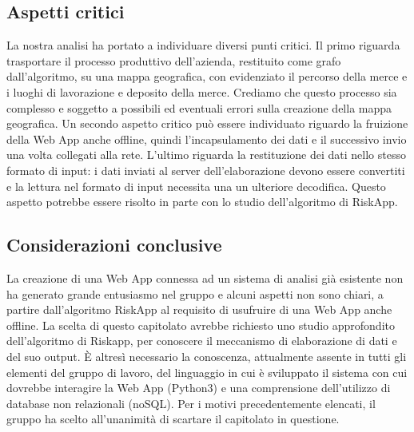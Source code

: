 \subsection{Aspetti critici}

La nostra analisi ha portato a individuare diversi punti critici. Il primo riguarda trasportare il processo produttivo dell’azienda, restituito come grafo dall’algoritmo, su una mappa geografica, con evidenziato il percorso della merce e i luoghi di lavorazione e deposito della merce. Crediamo che questo processo sia complesso e soggetto a possibili ed eventuali errori sulla creazione della mappa geografica.
Un secondo aspetto critico può essere individuato riguardo la fruizione della Web App anche offline, quindi l'incapsulamento dei dati e il successivo invio una volta collegati alla rete. 
L'ultimo riguarda la restituzione dei dati nello stesso formato di input: i dati inviati al server dell'elaborazione devono essere convertiti e la lettura nel formato di input necessita una un ulteriore decodifica. Questo aspetto potrebbe essere risolto in parte con lo studio dell’algoritmo di RiskApp.

\subsection{Considerazioni conclusive}

La creazione di una Web App connessa ad un sistema di analisi già esistente non ha generato grande entusiasmo nel gruppo e alcuni aspetti non sono chiari, a partire dall’algoritmo RiskApp al requisito di usufruire di una Web App anche offline. La scelta di questo capitolato avrebbe richiesto uno studio approfondito dell’algoritmo di Riskapp, per conoscere il meccanismo di elaborazione di dati e del suo output.
È altresì necessario la conoscenza, attualmente assente in tutti gli elementi del gruppo di lavoro, del linguaggio in cui è sviluppato il sistema con cui dovrebbe interagire la Web App (Python3) e una comprensione dell’utilizzo di database non relazionali (noSQL).
Per i motivi precedentemente elencati, il gruppo ha scelto all’unanimità di scartare il capitolato in questione. 